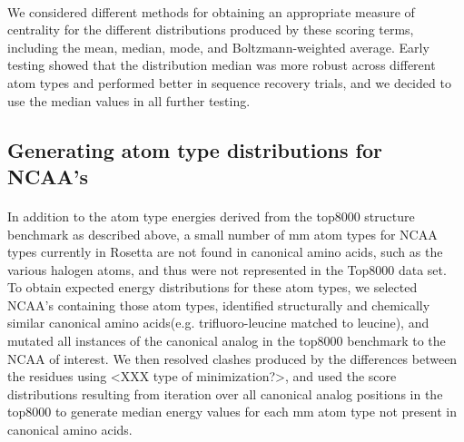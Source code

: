 \paragraph{}
We considered different methods for obtaining an appropriate measure of centrality for the different distributions produced by these scoring terms, including the mean, median, mode, and Boltzmann-weighted average.
Early testing showed that the distribution median was more robust across different atom types and performed better in sequence recovery trials, and we decided to use the median values in all further testing.


\subsection{Generating atom type distributions for NCAA's} 
\paragraph{}
In addition to the atom type energies derived from the top8000 structure benchmark as described above, a small number of mm atom types for NCAA types currently in Rosetta are not found in canonical amino acids, such as the various halogen atoms, and thus were not represented in the Top8000 data set.
To obtain expected energy distributions for these atom types, we selected NCAA's containing those atom types, identified structurally and chemically similar canonical amino acids(e.g. trifluoro-leucine matched to leucine), and mutated all instances of the canonical analog in the top8000 benchmark to the NCAA of interest.
We then resolved clashes produced by the differences between the residues using <XXX type of minimization?>, and used the score distributions resulting from iteration over all canonical analog positions in the top8000 to generate median energy values for each mm atom type not present in canonical amino acids.


